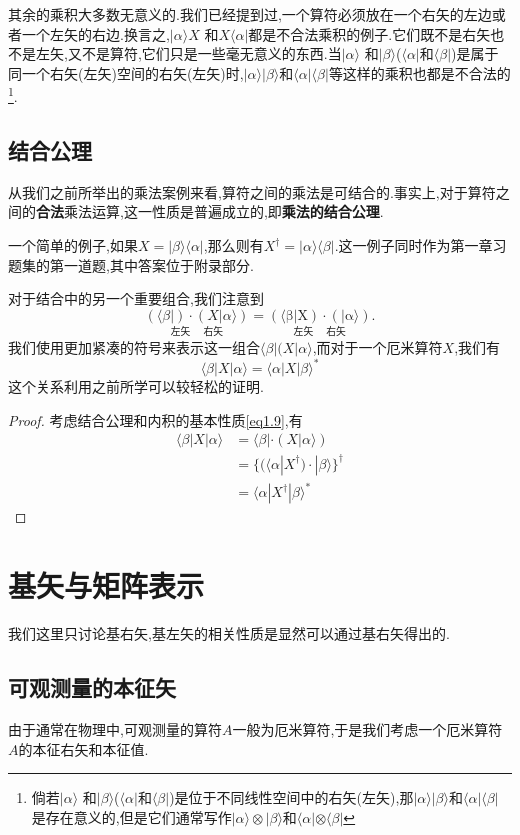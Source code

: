 其余的乘积大多数无意义的.我们已经提到过,一个算符必须放在一个右矢的左边或者一个左矢的右边.换言之,$|\alpha\rangle X$ 和$X\langle\alpha|$都是不合法乘积的例子.它们既不是右矢也不是左矢,又不是算符,它们只是一些毫无意义的东西.当$|\alpha\rangle$ 和$|\beta\rangle$($\langle\alpha|$和$\langle\beta|$)是属于同一个右矢(左矢)空间的右矢(左矢)时,$|\alpha\rangle|\beta\rangle$和$\langle\alpha|\langle\beta|$等这样的乘积也都是不合法的\footnote{倘若$|\alpha\rangle$ 和$|\beta\rangle$($\langle\alpha|$和$\langle\beta|$)是位于不同线性空间中的右矢(左矢),那$|\alpha\rangle|\beta\rangle$和$\langle\alpha|\langle\beta|$是存在意义的,但是它们通常写作$|\alpha\rangle\otimes|\beta\rangle$和$\langle\alpha|\otimes\langle\beta|$}.
\subsection{结合公理}
从我们之前所举出的乘法案例来看,算符之间的乘法是可结合的.事实上,对于算符之间的\textbf{合法}乘法运算,这一性质是普遍成立的,即\textbf{乘法的结合公理}.

一个简单的例子,如果$X=|\beta\rangle\langle\alpha|$,那么则有$X^\dagger=|\alpha\rangle\langle\beta|$.这一例子同时作为第一章习题集的第一道题,其中答案位于附录部分.

对于结合中的另一个重要组合,我们注意到
$$ \underset{\text{左矢}\quad\text{  右矢}}{(\langle\beta|)\cdot(X|\alpha\rangle)}=\underset{\text{左矢}\quad\text{ 右矢}}{\operatorname*{(\langle\beta|X)\cdot(|\alpha\rangle)}}.$$
我们使用更加紧凑的符号来表示这一组合$\langle\beta|(X|\alpha\rangle$,而对于一个厄米算符$X$,我们有
\begin{equation}
	\langle\beta|X|\alpha\rangle=\langle\alpha|X|\beta\rangle^*
\end{equation}
这个关系利用之前所学可以较轻松的证明.
\begin{proof}
	考虑结合公理和内积的基本性质\ref{eq1.9},有
	$$
	\begin{aligned}
		\langle\beta|X|\alpha\rangle & =\langle\beta|\cdot(X|\alpha\rangle) \\
		&=\{(\langle\alpha| X^\dagger)\cdot|\beta\rangle\}^\dagger \\
		&=\langle\alpha| X^\dagger|\beta\rangle^*
	\end{aligned}
	$$
\end{proof}
\section{基矢与矩阵表示}
我们这里只讨论基右矢,基左矢的相关性质是显然可以通过基右矢得出的.
\subsection{可观测量的本征矢}
由于通常在物理中,可观测量的算符$A$一般为厄米算符,于是我们考虑一个厄米算符$A$的本征右矢和本征值.


